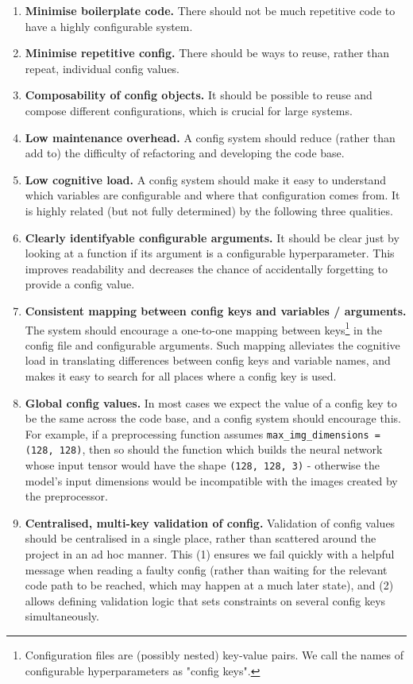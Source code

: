 \documentclass{itatnew}
\begin{document}
\begin{enumerate}
    \item \textbf{Minimise boilerplate code.} There should not be much repetitive code to have a highly configurable system.
    \item \textbf{Minimise repetitive config.} There should be ways to reuse, rather than repeat, individual config values.
    \item \textbf{Composability of config objects.} It should be possible to reuse and compose different configurations, which is crucial for large systems.
    \item \textbf{Low maintenance overhead.} A config system should reduce (rather than add to) the difficulty of refactoring and developing the code base.
    \item \textbf{Low cognitive load.} A config system should make it easy to understand which variables are configurable and where that configuration comes from. It is highly related (but not fully determined) by the following three qualities.
    \item \textbf{Clearly identifyable configurable arguments.} It should be clear just by looking at a function if its argument is a configurable hyperparameter. This improves readability and decreases the chance of accidentally forgetting to provide a config value.
    \item \textbf{Consistent mapping between config keys and variables / arguments.} The system should encourage a one-to-one mapping between keys\footnote{Configuration files are (possibly nested) key-value pairs. We call the names of configurable hyperparameters as "config keys".} in the config file and configurable arguments. Such mapping alleviates the cognitive load in translating differences between config keys and variable names, and makes it easy to search for all places where a config key is used.
    \item \textbf{Global config values.} In most cases we expect the value of a config key to be the same across the code base, and a config system should encourage this. For example, if a preprocessing function assumes \texttt{max_img_dimensions = (128, 128)}, then so should the function which builds the neural network whose input tensor would have the shape \texttt{(128, 128, 3)} - otherwise the model's input dimensions would be incompatible with the images created by the preprocessor.
    \item \textbf{Centralised, multi-key validation of config.} Validation of config values should be centralised in a single place, rather than scattered around the project in an ad hoc manner. This (1) ensures we fail quickly with a helpful message when reading a faulty config (rather than waiting for the relevant code path to be reached, which may happen at a much later state), and (2) allows defining validation logic that sets constraints on several config keys simultaneously.

\end{enumerate}
\end{document}
